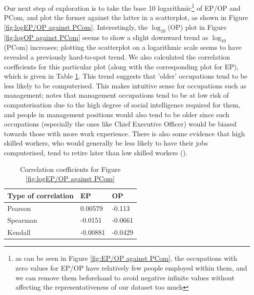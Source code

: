 \documentclass[11pt]{article}
\begin{document}
Our next step of exploration is to take the base 10 logarithmic\footnote{as can be seen in Figure \ref{fig:EP/OP against PCom}, the occupations with zero values for EP/OP have relatively few people employed within them, and we can remove them beforehand to avoid negative infinite values without affecting the representativeness of our dataset too much} of EP/OP and PCom, and plot the former against the latter in a scatterplot, as shown in Figure \ref{fig:logEP/OP against PCom}. Interestingly, the $\log_{10}$(OP) plot in Figure \ref{fig:logOP against PCom} seems to show a slight downward trend as $\log_{10}$(PCom) increases; plotting the scatterplot on a logarithmic scale seems to have revealed a previously hard-to-spot trend. We also calculated the correlation coefficients for this particular plot (along with the corresponding plot for EP), which is given in Table \ref{tab:logcorrelation}. This trend suggests that 'older' occupations tend to be less likely to be computerised. This makes intuitive sense for occupations such as management; \cite{osborne2017future} notes that management occupations tend to be at low risk of computerisation due to the high degree of social intelligence required for them, and people in management positions would also tend to be older since such occupations (especially the ones like Chief Executive Officer) would be biased towards those with more work experience. There is also some evidence that high skilled workers, who would generally be less likely to have their jobs computerised, tend to retire later than low skilled workers (\cite{HimmelreicherRalfK.2009Saao}).


\begin{table}[]
	\centering
	\begin{tabular}{l|ll|ll}
	\textbf{Type of correlation} & \multicolumn{2}{l|}{\textbf{EP}} & \multicolumn{2}{l}{\textbf{OP}} \\ \hline
	Pearson                      & \multicolumn{2}{l|}{0.00579}     & \multicolumn{2}{l}{-0.113}      \\ \hline
	Spearman                     & \multicolumn{2}{l|}{-0.0151}      & \multicolumn{2}{l}{-0.0661}    \\ \hline
	Kendall                      & \multicolumn{2}{l|}{-0.00881}      & \multicolumn{2}{l}{-0.0429}   
	\end{tabular}
	\caption{Correlation coefficients for Figure \ref{fig:logEP/OP against PCom}}
	\label{tab:logcorrelation}
	\end{table}
\end{document}
